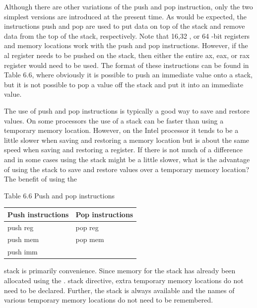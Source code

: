 \documentclass[10pt]{book}
\begin{document}
\begin{center}
\begin{center}
Although there are other variations of the push and pop instruction, only the two simplest versions are introduced at the present time. As would be expected, the instructions push and pop are used to put data on top of the stack and remove data from the top of the stack, respectively. Note that 16,32 , or 64 -bit registers and memory locations work with the push and pop instructions. However, if the al register needs to be pushed on the stack, then either the entire ax, eax, or rax register would need to be used. The format of these instructions can be found in Table 6.6, where obviously it is possible to push an immediate value onto a stack, but it is not possible to pop a value off the stack and put it into an immediate value.

The use of push and pop instructions is typically a good way to save and restore values. On some processors the use of a stack can be faster than using a temporary memory location. However, on the Intel processor it tends to be a little slower when saving and restoring a memory location but is about the same speed when saving and restoring a register. If there is not much of a difference and in some cases using the stack might be a little slower, what is the advantage of using the stack to save and restore values over a temporary memory location? The benefit of using the

Table 6.6 Push and pop instructions

\begin{center}
\begin{tabular}{|ll|}
\hline
Push instructions & Pop instructions \\
\hline
push reg & pop reg \\
push mem & pop mem \\
push imm &  \\
\hline
\end{tabular}
\end{center}

stack is primarily convenience. Since memory for the stack has already been allocated using the . stack directive, extra temporary memory locations do not need to be declared. Further, the stack is always available and the names of various temporary memory locations do not need to be remembered.



\end{center}
\end{center}
\end{document}
